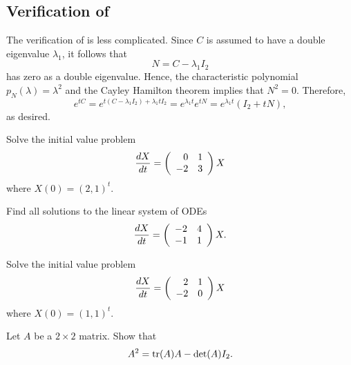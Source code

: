 \documentclass{ximera}
\begin{document}
\subsection*{Verification of \protect{}}

The verification of  is less complicated.  Since $C$ is assumed
to have a double eigenvalue $\lambda_1$, it follows that
\[
N = C - \lambda_1 I_2
\]
has zero as a double eigenvalue.  Hence, the characteristic polynomial
$p_N(\lambda) = \lambda^2$ and the Cayley Hamilton theorem implies that
$N^2=0$.  Therefore,
\[
e^{tC} = e^{t(C-\lambda_1 I_2)+\lambda_1 tI_2} =
e^{\lambda_1 t}e^{tN} = e^{\lambda_1 t}(I_2+tN),
\]
as desired.




\EXER

\TEXER

\begin{exercise} \label{c6.6.2}
Solve the initial value problem
\[
\frac{dX}{dt} = \left(\begin{array}{rr} 0 & 1\\ -2 &3\end{array}\right) X
\]
where $X(0)=(2,1)^t$.
\end{exercise}

\begin{exercise} \label{c6.6.3}
Find all solutions to the linear system of ODEs
\[
\frac{dX}{dt} = \left(\begin{array}{rr} -2 & 4\\ -1 &1\end{array}\right) X.
\]
\end{exercise}

\begin{exercise} \label{c6.6.4}
Solve the initial value problem
\[
\frac{dX}{dt} =  \left(\begin{array}{rr} 2 & 1\\ -2 &0\end{array}\right)X
\]
where $X(0)=(1,1)^t$.
\end{exercise}

\begin{exercise}  \label{c6.CH}
Let $A$ be a $2\times 2$ matrix.  Show that
\[
A^2 = {\rm tr}(A)A-\det(A)I_2.
\]
\end{exercise}
\end{document}
